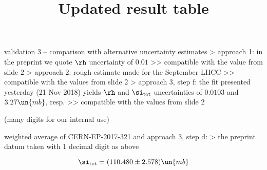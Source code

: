 \> validation 3 -- comparison with alternative uncertainty estimates
\>> approach 1: in the preprint we quote $\rh$ uncertainty of $0.01$
\>>> compatible with the value from slide 2
\>> approach 2: rough estimate made for the September LHCC
\>>> compatible with the values from slide 2
\>> approach 3, step f: the fit presented yesterday (21 Nov 2018) yields $\rh$ and $\si_{\rm tot}$ uncertainties of $0.0103$ and $3.27\un{mb}$, resp.
\>>> compatible with the values from slide 2


\newpage %
\title{Updated result table}

(many digits for our internal use)

\cBlack
\centerline{
}

\> weighted average of CERN-EP-2017-321 and approach 3, step d:
\>> the preprint datum taken with 1 decimal digit as above

\cThird
$$\si_{\rm tot} = (110.480 \pm 2.578)\un{mb}$$


\vfil
\eject
\bye
